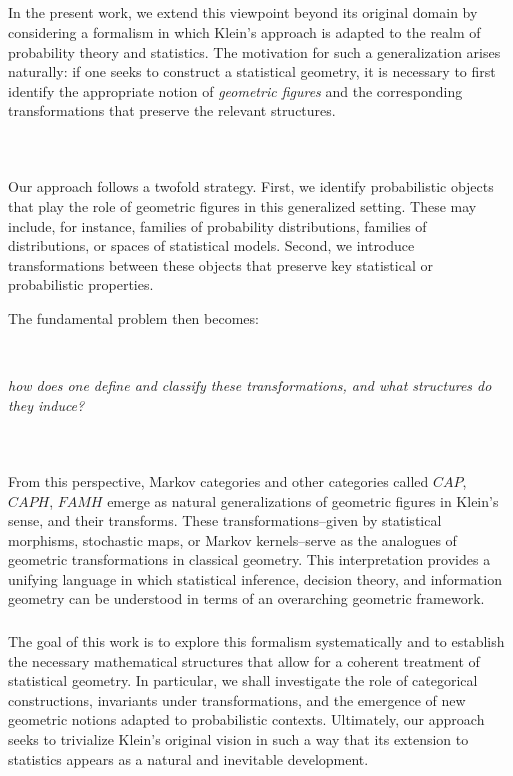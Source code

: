 \subsection{}
In the present work, we extend this viewpoint beyond its original domain by considering a formalism in which Klein’s approach is adapted to the realm of probability theory and statistics. The motivation for such a generalization arises naturally: if one seeks to construct a statistical geometry, it is necessary to first identify the appropriate notion of \textit{geometric figures} and the corresponding transformations that preserve the relevant structures. 

\,
\subsubsection{}
Our approach follows a twofold strategy. First, we identify probabilistic objects that play the role of geometric figures in this generalized setting. These may include, for instance, families of probability distributions, families of distributions, or spaces of statistical models. Second, we introduce transformations between these objects that preserve key statistical or probabilistic properties. 
\, 

The fundamental problem then becomes: 

\,

\emph{how does one define and classify these transformations, and what structures do they induce?}

\,
\subsubsection{}
From this perspective, Markov categories and other categories called $CAP$, $CAPH$, 
$FAMH$ emerge as natural generalizations of geometric figures in Klein’s sense, and their transforms. These transformations--given by statistical morphisms, stochastic maps, or Markov kernels--serve as the analogues of geometric transformations in classical geometry. This interpretation provides a unifying language in which statistical inference, decision theory, and information geometry can be understood in terms of an overarching geometric framework.

\subsubsection{}

The goal of this work is to explore this formalism systematically and to establish the necessary mathematical structures that allow for a coherent treatment of statistical geometry. In particular, we shall investigate the role of categorical constructions, invariants under transformations, and the emergence of new geometric notions adapted to probabilistic contexts. Ultimately, our approach seeks to trivialize Klein’s original vision in such a way that its extension to statistics appears as a natural and inevitable development.

